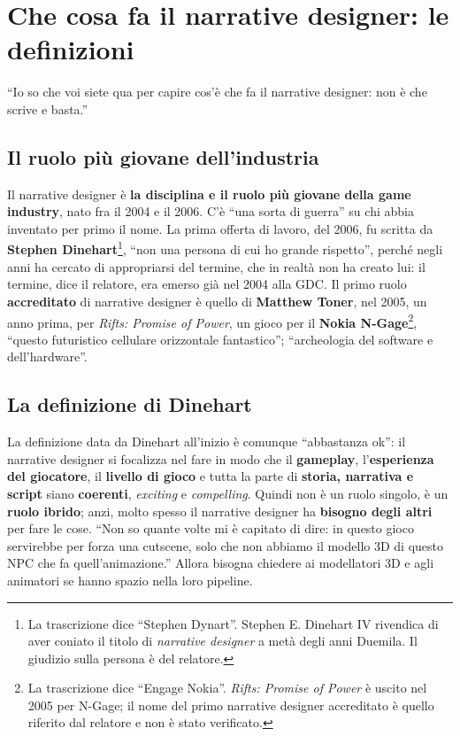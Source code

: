 \section{Che cosa fa il narrative designer: le definizioni}
\label{p3:sec:definizioni}

``Io so che voi siete qua per capire cos'è che fa il narrative designer:
non è che scrive e basta.''

\subsection{Il ruolo più giovane dell'industria}

Il narrative designer è \textbf{la disciplina e il ruolo più giovane della
game industry}, nato fra il 2004 e il 2006. C'è ``una sorta di guerra'' su
chi abbia inventato per primo il nome. La prima offerta di lavoro, del 2006,
fu scritta da \textbf{Stephen Dinehart}\footnote{La trascrizione dice
``Stephen Dynart''. Stephen E. Dinehart IV rivendica di aver coniato il
titolo di \emph{narrative designer} a metà degli anni Duemila. Il giudizio
sulla persona è del relatore.}, ``non una persona di cui ho grande
rispetto'', perché negli anni ha cercato di appropriarsi del termine, che in
realtà non ha creato lui: il termine, dice il relatore, era emerso già nel
2004 alla GDC. Il primo ruolo \textbf{accreditato} di narrative designer è
quello di \textbf{Matthew Toner}, nel 2005, un anno prima, per \emph{Rifts:
Promise of Power}, un gioco per il \textbf{Nokia N-Gage}\footnote{La
trascrizione dice ``Engage Nokia''. \emph{Rifts: Promise of Power} è uscito
nel 2005 per N-Gage; il nome del primo narrative designer accreditato è
quello riferito dal relatore e non è stato verificato.}, ``questo futuristico
cellulare orizzontale fantastico''; ``archeologia del software e
dell'hardware''.

\subsection{La definizione di Dinehart}

La definizione data da Dinehart all'inizio è comunque ``abbastanza ok'':
il narrative designer si focalizza nel fare in modo che il \textbf{gameplay},
l'\textbf{esperienza del giocatore}, il \textbf{livello di gioco} e tutta la
parte di \textbf{storia, narrativa e script} siano \textbf{coerenti},
\emph{exciting} e \emph{compelling}. Quindi non è un ruolo singolo, è un
\textbf{ruolo ibrido}; anzi, molto spesso il narrative designer ha
\textbf{bisogno degli altri} per fare le cose. ``Non so quante volte mi è
capitato di dire: in questo gioco servirebbe per forza una cutscene, solo che
non abbiamo il modello 3D di questo NPC che fa quell'animazione.'' Allora
bisogna chiedere ai modellatori 3D e agli animatori se hanno spazio nella loro
pipeline.

